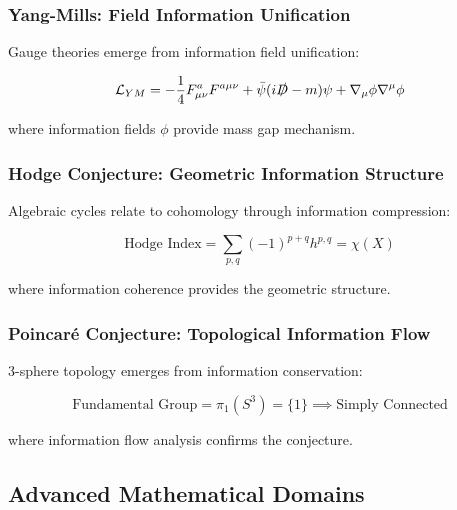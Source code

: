 \subsubsection{Yang-Mills: Field Information Unification}

\begin{theorem}
Gauge theories emerge from information field unification:

\begin{equation}
\mathcal{L}_{YM} = -\frac{1}{4} F^a_{\mu\nu} F^{a\mu\nu} + \bar{\psi} (i \slashed{D} - m) \psi + \nabla_\mu \phi \nabla^\mu \phi
\end{equation}

where information fields $\phi$ provide mass gap mechanism.
\end{theorem}

\subsubsection{Hodge Conjecture: Geometric Information Structure}

\begin{theorem}
Algebraic cycles relate to cohomology through information compression:

\begin{equation}
\text{Hodge Index} = \sum_{p,q} (-1)^{p+q} h^{p,q} = \chi(X)
\end{equation}

where information coherence provides the geometric structure.
\end{theorem}

\subsubsection{Poincaré Conjecture: Topological Information Flow}

\begin{theorem}
3-sphere topology emerges from information conservation:

\begin{equation}
\text{Fundamental Group} = \pi_1(S^3) = \{1\} \implies \text{Simply Connected}
\end{equation}

where information flow analysis confirms the conjecture.
\end{theorem}

\subsection{Advanced Mathematical Domains}

